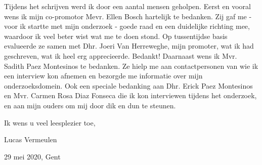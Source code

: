 Tijdens het schrijven werd ik door een aantal mensen geholpen. Eerst en vooral wens ik mijn co-promotor Mevr. Ellen Bosch hartelijk te bedanken. Zij gaf me - voor ik startte met mijn onderzoek - goede raad en een duidelijke richting mee, waardoor ik veel beter wist wat me te doen stond. Op tussentijdse basis evalueerde ze samen met Dhr. Joeri Van Herreweghe, mijn promoter, wat ik had geschreven, wat ik heel erg apprecieerde. Bedankt! Daarnaast wens ik Mvr. Sadith Paez Montesinos te bedanken. Ze hielp me aan contactpersonen van wie ik een interview kon afnemen en bezorgde me informatie over mijn onderzoeksdomein. Ook een speciale bedanking aan Dhr. Erick Paez Montesinos en Mvr. Carmen Rosa Diaz Fonseca die ik kon interviewen tijdens het onderzoek, en aan mijn ouders om mij door dik en dun te steunen.

Ik wens u veel leesplezier toe,

Lucas Vermeulen

29 mei 2020, Gent